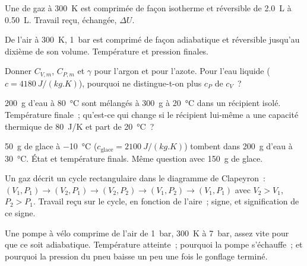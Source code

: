 \begin{exercise}[$\star$]\label{exo:b1:first-law:2}
Une  de gaz à \qty{300}{K} est comprimée de façon isotherme et
réversible de \qty{2.0}{L} à \qty{0.50}{L}. Travail reçu,  échangée,
$\Delta U$.
\end{exercise}

\begin{exercise}[$\star$]\label{exo:b1:first-law:3}
De l'air à \qty{300}{K}, \qty{1}{bar} est comprimé de façon adiabatique et
réversible jusqu'au dixième de son volume. Température et pression finales.
\end{exercise}

\begin{exercise}[$\star$]\label{exo:b1:first-law:4}
Donner $C_{V,m}$, $C_{P,m}$ et $\gamma$ pour l'argon et pour l'azote. Pour
l'eau liquide ($c = \qty{4180}{J/(kg.K)}$), pourquoi ne distingue-t-on plus
$c_P$ de $c_V$~?
\end{exercise}

\begin{exercise}[$\star\star$]\label{exo:b1:first-law:5}
\qty{200}{g} d'eau à \qty{80}{\degreeCelsius} sont mélangés à \qty{300}{g}
à \qty{20}{\degreeCelsius} dans un récipient isolé. Température finale~; qu'est-ce
qui change si le récipient lui-même a une capacité thermique de \qty{80}{J/K}
et part de \qty{20}{\degreeCelsius}~?
\end{exercise}

\begin{exercise}[$\star\star$]\label{exo:b1:first-law:6}
\qty{50}{g} de glace à \qty{-10}{\degreeCelsius} ($c_{\text{glace}} = \qty{2100}{J/(kg.K)}$)
tombent dans \qty{200}{g} d'eau à \qty{30}{\degreeCelsius}. État et
température finals. Même question avec \qty{150}{g} de glace.
\end{exercise}

\begin{exercise}[$\star\star$]\label{exo:b1:first-law:7}
Un gaz décrit un cycle rectangulaire dans le diagramme de Clapeyron~: $(V_1, P_1)
\to (V_2, P_1) \to (V_2, P_2) \to (V_1, P_2) \to (V_1, P_1)$ avec $V_2 > V_1$,
$P_2 > P_1$. Travail reçu sur le cycle, en fonction de l'aire~; signe, et
signification de ce signe.
\end{exercise}

\begin{exercise}[$\star\star$]\label{exo:b1:first-law:8}
Une pompe à vélo comprime de l'air de \qty{1}{bar}, \qty{300}{K} à
\qty{7}{bar}, assez vite pour que ce soit adiabatique. Température atteinte~;
pourquoi la pompe s'échauffe~; et pourquoi la pression du pneu baisse un peu
une fois le gonflage terminé.
\end{exercise}

